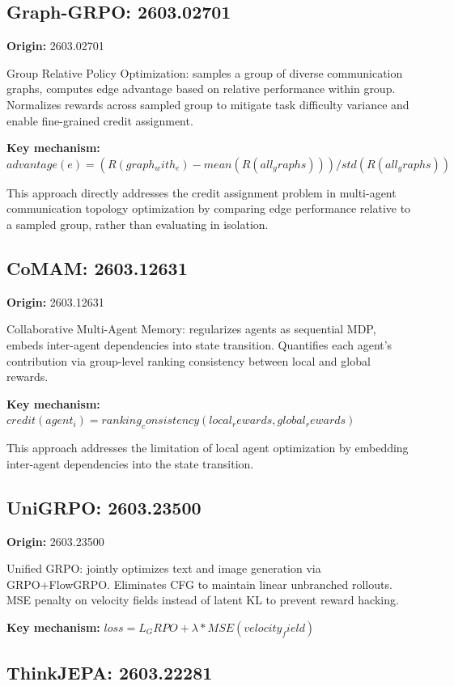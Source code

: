 \documentclass[11pt]{article}
\begin{document}
\subsection{Graph-GRPO: 2603.02701}

{\bf Origin:} 2603.02701

Group Relative Policy Optimization: samples a group of diverse communication graphs, computes edge advantage based on relative performance within group. Normalizes rewards across sampled group to mitigate task difficulty variance and enable fine-grained credit assignment.

{\bf Key mechanism:} $advantage(e) = (R(graph_with_e) - mean(R(all_graphs))) / std(R(all_graphs))$

This approach directly addresses the credit assignment problem in
multi-agent communication topology optimization by comparing edge performance
relative to a sampled group, rather than evaluating in isolation.

\subsection{CoMAM: 2603.12631}

{\bf Origin:} 2603.12631

Collaborative Multi-Agent Memory: regularizes agents as sequential MDP, embeds inter-agent dependencies into state transition. Quantifies each agent's contribution via group-level ranking consistency between local and global rewards.

{\bf Key mechanism:} $credit(agent_i) = ranking_consistency(local_rewards, global_rewards)$

This approach addresses the limitation of local agent optimization
by embedding inter-agent dependencies into the state transition.

\subsection{UniGRPO: 2603.23500}

{\bf Origin:} 2603.23500

Unified GRPO: jointly optimizes text and image generation via GRPO+FlowGRPO. Eliminates CFG to maintain linear unbranched rollouts. MSE penalty on velocity fields instead of latent KL to prevent reward hacking.

{\bf Key mechanism:} $loss = L_GRPO + λ * MSE(velocity_field)$

\subsection{ThinkJEPA: 2603.22281}
\end{document}
